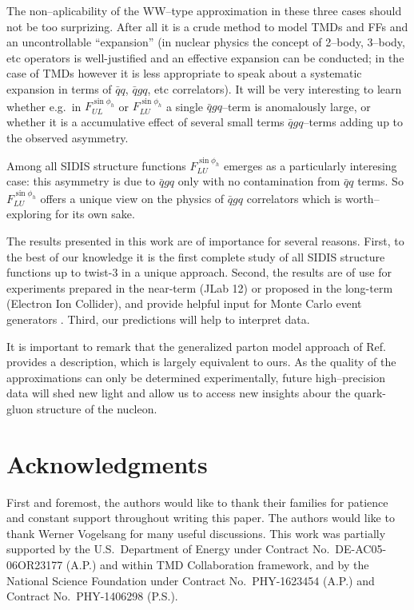 \documentclass[a4paper,11pt]{article}
\begin{document}
The non--aplicability of the WW--type approximation in these three
cases should not be too surprizing. After all it is a crude method
to model TMDs and FFs and an uncontrollable ``expansion''
(in nuclear physics the concept of 2--body, 3--body, etc operators
is well-justified and an effective expansion can be conducted; in
the case of TMDs however it is less appropriate to speak about a
systematic expansion in terms of $\bar qq$, $\bar qgq$, etc 
correlators). It will be very interesting to learn whether e.g.\ 
in $F_{UL}^{\sin\phi_h}$ or $F_{LU}^{\sin\phi_h}$ a single $\bar qgq$--term 
is anomalously large, or whether it is a accumulative effect of 
several small terms $\bar qgq$--terms adding up to the observed asymmetry.

Among all SIDIS structure functions $F_{LU}^{\sin\phi_h}$ emerges as
a particularly interesing case: this asymmetry is due to $\bar qgq$
only with no contamination from $\bar qq$ terms.
So $F_{LU}^{\sin\phi_h}$ offers a unique view on the physics of $\bar qgq$ 
correlators which is worth--exploring for its own sake.

The results presented in this work are of importance for several reasons.
First, to the best of our knowledge it is the first complete study 
of all SIDIS structure functions up to twist-3 in a unique approach. 
Second, the results are of use for experiments prepared in the near-term 
(JLab 12) or proposed in the long-term (Electron Ion Collider),
and provide helpful input for Monte Carlo event generators 
\cite{Avakian:2015vha}.
Third, our predictions will help to interpret data.

It is important to remark that the generalized parton model 
approach of Ref.~\cite{Anselmino:2011ch} provides a description,
which is largely equivalent to ours. As the quality of the 
approximations can only be determined experimentally, future
high--precision data will shed new light and allow us to 
access new insights abour the quark-gluon structure
of the nucleon.


\section{Acknowledgments}
First and foremost, the authors would like to thank their families for patience and
constant support throughout writing this paper. The authors would like to thank Werner Vogelsang for many useful discussions. This work was 
partially supported by the U.S.\ Department of Energy under 
Contract No.~DE-AC05-06OR23177 (A.P.) and within TMD Collaboration framework, and by the National 
Science Foundation under Contract No.\ PHY-1623454 (A.P.)
and Contract No.\ PHY-1406298 (P.S.).
\end{document}
